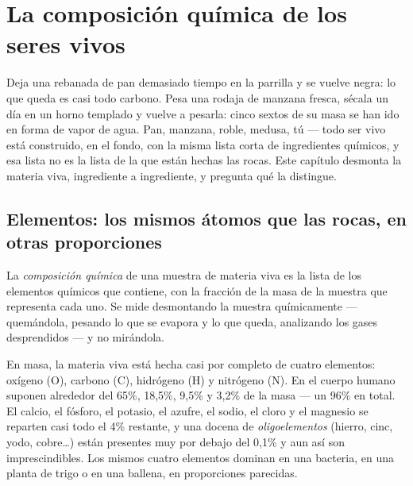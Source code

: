 \chapter{La composición química de los seres vivos}\label{ch:g10:chemistry-of-life}

Deja una rebanada de pan demasiado tiempo en la parrilla y se vuelve
negra: lo que queda es casi todo carbono. Pesa una rodaja de manzana
fresca, sécala un día en un horno templado y vuelve a pesarla: cinco
sextos de su masa se han ido en forma de vapor de agua. Pan, manzana,
roble, medusa, tú --- todo ser vivo está construido, en el fondo, con
la misma lista corta de ingredientes químicos, y esa lista no es la
lista de la que están hechas las rocas. Este capítulo desmonta la
materia viva, ingrediente a ingrediente, y pregunta qué la distingue.

\section{Elementos: los mismos átomos que las rocas, en otras proporciones}

\begin{definition}\label{def:g10:chemistry-of-life:composition}
La \emph{composición química} de una
muestra de materia viva es la lista de los elementos químicos que
contiene, con la fracción de la masa de la muestra que representa cada
uno. Se mide desmontando la muestra químicamente --- quemándola,
pesando lo que se evapora y lo que queda, analizando los gases
desprendidos --- y no mirándola.
\end{definition}

\begin{proposition}\label{prop:g10:chemistry-of-life:four}
En masa, la materia viva está hecha casi por completo de cuatro
elementos: oxígeno (O), carbono (C), hidrógeno (H) y nitrógeno (N). En
el cuerpo humano suponen alrededor del 65\%, 18,5\%, 9,5\% y 3,2\% de
la masa --- un 96\% en total. El calcio, el fósforo, el potasio, el
azufre, el sodio, el cloro y el magnesio se reparten casi todo el 4\%
restante, y una docena de \emph{oligoelementos} (hierro, cinc, yodo,
cobre\dots) están presentes muy por debajo del 0,1\% y aun así son
imprescindibles. Los mismos cuatro elementos dominan en una bacteria,
en una planta de trigo o en una ballena, en proporciones parecidas.
\end{proposition}
\admitted

